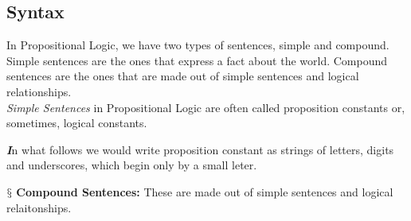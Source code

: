 \documentclass[10pt,a4pape,twocolumn]{article}
\newenvironment{callout}
	{\begin{calloutbox}\color{charcoal}\textbf\textit}
	{\end{calloutbox}}
\newcommand{\newpoint}[1]{\indent$\mathsection$ \textbf{#1}}
\begin{document}
            \subsection{Syntax}
                In Propositional Logic, we have two types of sentences, simple and compound. Simple sentences are the ones that express a fact about the world. Compound sentences are the ones that are made out of simple sentences and logical relationships.
                \\
                \textit{Simple Sentences} in Propositional Logic are often called proposition constants or, sometimes, logical constants. 
                \begin{callout}
                        In what follows we would write proposition constant as strings of letters, digits and underscores, which begin only by a small leter.
                \end{callout}
                \newpoint{Compound Sentences:} These are made out of simple sentences and logical relaitonships. 
\end{document}
